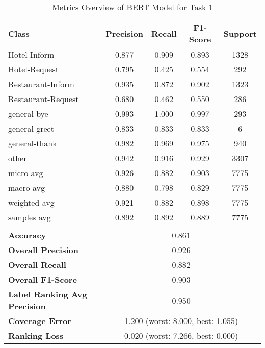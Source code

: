 
\begin{table}[h]
\centering

\begin{tabular}{|l|c|c|c|c|}
\hline
\textbf{Class}& \textbf{Precision} & \textbf{Recall} & \textbf{F1-Score} & \textbf{Support} \\ \hline
Hotel-Inform & 0.877 & 0.909 & 0.893 & 1328 \\ \hline
Hotel-Request & 0.795 & 0.425 & 0.554 & 292 \\ \hline
Restaurant-Inform & 0.935 & 0.872 & 0.902 & 1323 \\ \hline
Restaurant-Request & 0.680 & 0.462 & 0.550 & 286 \\ \hline
general-bye & 0.993 & 1.000 & 0.997 & 293 \\ \hline
general-greet & 0.833 & 0.833 & 0.833 & 6 \\ \hline
general-thank & 0.982 & 0.969 & 0.975 & 940 \\ \hline
other & 0.942 & 0.916 & 0.929 & 3307 \\ \hline\hline
micro avg & 0.926 & 0.882 & 0.903 & 7775 \\ \hline
macro avg & 0.880 & 0.798 & 0.829 & 7775 \\ \hline
weighted avg & 0.921 & 0.882 & 0.898 & 7775 \\ \hline
samples avg & 0.892 & 0.892 & 0.889 & 7775 \\ \hline
\multicolumn{5}{c}{}\\ \hline

\textbf{Accuracy}                    & \multicolumn{4}{c|}{0.861}                                 \\ \hline
\textbf{Overall Precision}           & \multicolumn{4}{c|}{0.926}                                \\ \hline
\textbf{Overall Recall}              & \multicolumn{4}{c|}{0.882}                                   \\ \hline
\textbf{Overall F1-Score}            & \multicolumn{4}{c|}{0.903}                                  \\ \hline
\textbf{Label Ranking Avg Precision} & \multicolumn{4}{c|}{0.950}                                    \\ \hline
\textbf{Coverage Error}              & \multicolumn{4}{c|}{1.200 (worst: 8.000, best: 1.055)}                             \\ \hline
\textbf{Ranking Loss}                & \multicolumn{4}{c|}{0.020 (worst: 7.266, best: 0.000)}                             \\ \hline
\end{tabular}

\caption{Metrics Overview of BERT Model for Task 1}
\label{table:BERT_metrics_task_1}
\end{table}
    